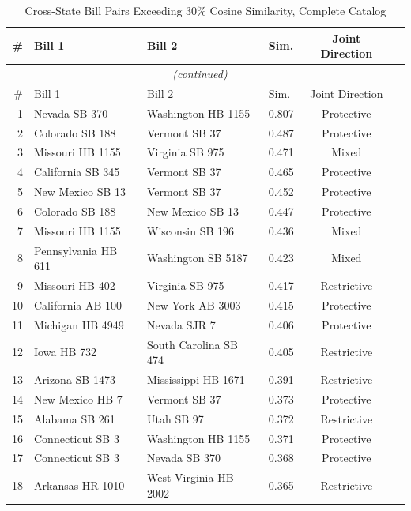 \documentclass[12pt]{report}
\begin{document}
\begin{longtable}{rlllcl}
\caption{Cross-State Bill Pairs Exceeding 30\% Cosine Similarity, Complete Catalog}
\label{tab:cross_state_pairs_full} \\
\toprule
\# & Bill 1 & Bill 2 & Sim. & Joint Direction \\
\midrule
\endfirsthead
\multicolumn{5}{c}{\textit{(continued)}} \\
\toprule
\# & Bill 1 & Bill 2 & Sim. & Joint Direction \\
\midrule
\endhead
\bottomrule
\endfoot

1  & Nevada SB 370        & Washington HB 1155   & 0.807 & Protective  \\
2  & Colorado SB 188      & Vermont SB 37        & 0.487 & Protective  \\
3  & Missouri HB 1155     & Virginia SB 975      & 0.471 & Mixed       \\
4  & California SB 345    & Vermont SB 37        & 0.465 & Protective  \\
5  & New Mexico SB 13     & Vermont SB 37        & 0.452 & Protective  \\
6  & Colorado SB 188      & New Mexico SB 13     & 0.447 & Protective  \\
7  & Missouri HB 1155     & Wisconsin SB 196     & 0.436 & Mixed       \\
8  & Pennsylvania HB 611  & Washington SB 5187   & 0.423 & Mixed       \\
9  & Missouri HB 402      & Virginia SB 975      & 0.417 & Restrictive \\
10 & California AB 100    & New York AB 3003     & 0.415 & Protective  \\
\midrule
11 & Michigan HB 4949     & Nevada SJR 7         & 0.406 & Protective  \\
12 & Iowa HB 732          & South Carolina SB 474 & 0.405 & Restrictive \\
13 & Arizona SB 1473      & Mississippi HB 1671  & 0.391 & Restrictive \\
14 & New Mexico HB 7      & Vermont SB 37        & 0.373 & Protective  \\
15 & Alabama SB 261       & Utah SB 97           & 0.372 & Restrictive \\
16 & Connecticut SB 3     & Washington HB 1155   & 0.371 & Protective  \\
17 & Connecticut SB 3     & Nevada SB 370        & 0.368 & Protective  \\
18 & Arkansas HR 1010     & West Virginia HB 2002 & 0.365 & Restrictive \\

\end{longtable}
\end{document}

